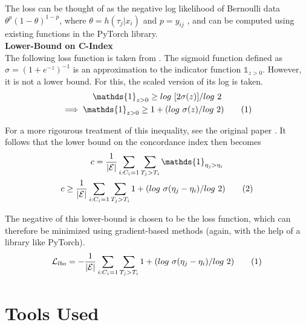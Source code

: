 \documentclass[%
 twocolumn,
 reprint,
 amsmath,amssymb,
 aps,nofootinbib
]{revtex4-2}
\newcommand\numberthis{\addtocounter{equation}{1}\tag{\theequation}} %
\begin{document}
The loss can be thought of as the negative log likelihood of Bernoulli data $\theta^p(1-\theta)^{1-p}$, where $\theta=h(\tau_j|x_i)$ and $p=y_{ij}$ \cite{bin_x_entropy_brown}, and can be computed using existing functions in the PyTorch library.\\

\textbf{Lower-Bound on C-Index}\\
The following loss function is taken from \cite{raykar_cindex}. The sigmoid function defined as $\sigma = (1 + e^{-z})^{-1}$ is an approximation to the indicator function $\mathds{1}_{z>0}$. However, it is not a lower bound. For this, the scaled version of its log is taken.
\begin{gather*}
\mathds{1}_{z>0} \ge log\ [2\sigma(z)]/log\ 2\\
\implies \mathds{1}_{z>0} \ge 1 + (log\ \sigma(z)/log\ 2) \numberthis  \label{eq:cindex_inequality}
\end{gather*}

For a more rigourous treatment of this inequality, see the original paper \cite{raykar_cindex}. It follows that the lower bound on the concordance index then becomes
\begin{gather*}
c = \frac{1}{|\mathcal{E}|}\sum_{i:C_i = 1}\sum_{T_j > T_i} \mathds{1}_{\eta_j > \eta_i}\\
c \ge \frac{1}{|\mathcal{E}|}\sum_{i:C_i = 1}\sum_{T_j > T_i} 1 +  (log\ \sigma(\eta_j - \eta_i)/log\ 2) \numberthis  \label{eq:cindex_lbo}
\end{gather*}

The negative of this lower-bound is chosen to be the loss function, which can therefore be minimized using gradient-based methods (again, with the help of a library like PyTorch).
\[
\mathcal{L}_{lbo} = -\frac{1}{|\mathcal{E}|}\sum_{i:C_i = 1}\sum_{T_j > T_i} 1 +  (log\ \sigma(\eta_j - \eta_i)/log\ 2) \numberthis  \label{eq:l_lbo}
\]


\section{\label{appdx2}Tools Used}
\end{document}
